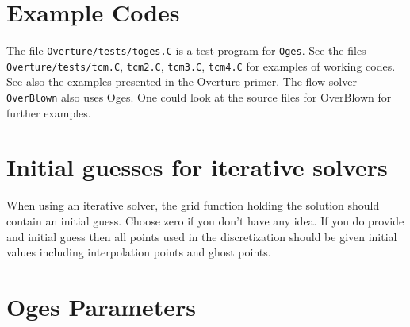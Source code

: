 \documentclass[11pt]{article}
\begin{document}
\section{Example Codes}

The file {\tt Overture/tests/toges.C} is a test program for {\tt Oges}.
See the files {\tt Overture/tests/tcm.C}, {\tt tcm2.C}, {\tt tcm3.C}, {\tt tcm4.C} for
examples of working codes. See also the examples presented in the Overture primer\cite{PRIMER}.
The flow solver {\tt OverBlown} \cite{OverBlownUserGuide} also uses Oges. One could look at the source
files for OverBlown for further examples.


\section{Initial guesses for iterative solvers}

When using an iterative solver, the grid function holding the solution should
contain an initial guess. Choose zero if you don't have any idea. If you do
provide and initial guess then all points used in the discretization should be
given initial values including interpolation points and ghost points.


% 



% 

\vfill\eject



\vfill\eject
\section{Oges Parameters} \label{sec:OgesParameters}
\end{document}
